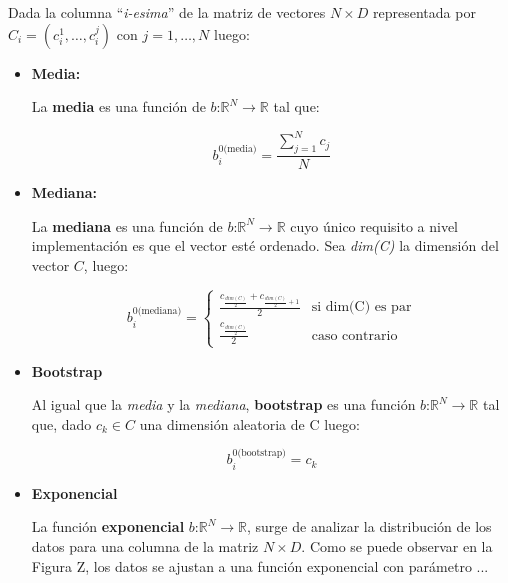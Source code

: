 	Dada la columna ``\textit{i-esima}'' de la matriz de vectores $N \times D$ representada por $C_i = (c_{i}^1, \dots, c_{i}^j)$ con $j=1, \dots, N$ luego:

	\begin{itemize}
	
	\item \textbf{Media:}
	
	La \textbf{media} es una función de $\textit{b:}\mathbb{R}^{N} \rightarrow \mathbb{R}$ tal que:
	
	$$b_{i}^{0\text{(media)}} = \frac{\sum_{j=1}^N c_j}{N} $$

	\item \textbf{Mediana:}
	
	La \textbf{mediana} es una función de $\textit{b:}\mathbb{R}^{N} \rightarrow \mathbb{R}$ cuyo único requisito a nivel implementación es que el vector esté ordenado. Sea \textit{dim(C)} la dimensión del vector $C$, luego:
	
	\[
    		b_{i}^{0\text{(mediana)}} = 
		\begin{cases}
    			\frac{c_{\frac{dim(C)}{2}} + c_{\frac{dim(C)}{2}+1}}{2} & \text{si dim(C) es par}\\
    			\frac{c_{\frac{dim(C)}{2}}}{2} & \text{caso contrario}
		\end{cases}
	\]
	
	\item \textbf{Bootstrap}
	
	Al igual que la \textit{media} y la \textit{mediana}, \textbf{bootstrap} es una función $\textit{b:}\mathbb{R}^{N} \rightarrow \mathbb{R}$ tal que, dado $c_k \in C$ una dimensión aleatoria de C luego:
	
	$$ b_{i}^{0\text{(bootstrap)}} = c_k $$

	\item \textbf{Exponencial}
	
	La función \textbf{exponencial} $\textit{b:}\mathbb{R}^{N} \rightarrow \mathbb{R}$, surge de analizar la distribución de los datos para una columna de la matriz $N \times D$. Como se puede observar en la Figura Z, los datos se ajustan a una función exponencial con parámetro ... 
	
	\end{itemize}

	